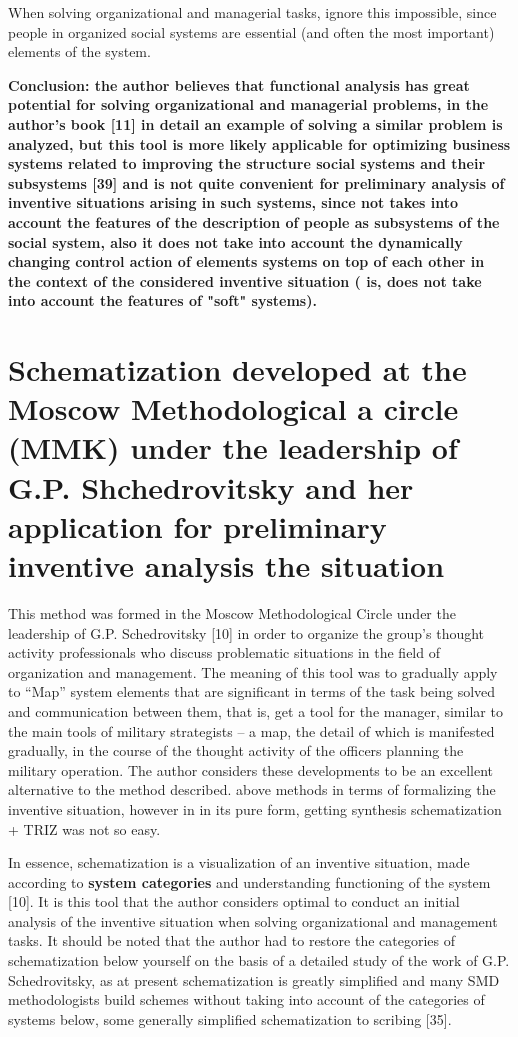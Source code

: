 When solving organizational and managerial tasks, ignore this impossible,
since people in organized social systems are essential (and often the most
important) elements of the system.

\textbf{Conclusion: the author believes that functional analysis has great
  potential for solving organizational and managerial problems, in the
  author’s book [11] in detail an example of solving a similar problem is
  analyzed, but this tool is more likely applicable for optimizing business
  systems related to improving the structure social systems and their
  subsystems [39] and is not quite convenient for preliminary analysis of
  inventive situations arising in such systems, since not takes into account
  the features of the description of people as subsystems of the social
  system, also it does not take into account the dynamically changing control
  action of elements systems on top of each other in the context of the
  considered inventive situation ( is, does not take into account the features
  of "soft" systems).}

\section{Schematization developed at the Moscow Methodological a circle (MMK)
  under the leadership of G.P. Shchedrovitsky and her application for
  preliminary inventive analysis the situation}

This method was formed in the Moscow Methodological Circle under the
leadership of G.P. Schedrovitsky [10] in order to organize the group’s thought
activity professionals who discuss problematic situations in the field of
organization and management. The meaning of this tool was to gradually apply
to “Map” system elements that are significant in terms of the task being
solved and communication between them, that is, get a tool for the manager,
similar to the main tools of military strategists -- a map, the detail of
which is manifested gradually, in the course of the thought activity of the
officers planning the military operation. The author considers these
developments to be an excellent alternative to the method described.  above
methods in terms of formalizing the inventive situation, however in in its
pure form, getting synthesis schematization + TRIZ was not so easy.

In essence, schematization is a visualization of an inventive situation, made
according to \textbf{system categories} and understanding functioning of the
system [10]. It is this tool that the author considers optimal to conduct an
initial analysis of the inventive situation when solving organizational and
management tasks. It should be noted that the author had to restore the
categories of schematization below yourself on the basis of a detailed study
of the work of G.P. Schedrovitsky, as at present schematization is greatly
simplified and many SMD methodologists build schemes without taking into
account of the categories of systems below, some generally simplified
schematization to scribing [35].

